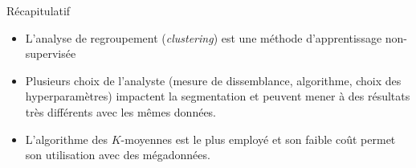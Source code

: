 \documentclass[
  ignorenonframetext,
]{beamer}
\providecommand{\tightlist}{%
  \setlength{\itemsep}{0pt}\setlength{\parskip}{0pt}}\usepackage{longtable,booktabs,array}
\begin{document}
\begin{frame}{Récapitulatif}
\protect\hypertarget{ruxe9capitulatif}{}
\begin{itemize}
\tightlist
\item
  L'analyse de regroupement (\emph{clustering}) est une méthode
  d'apprentissage non-supervisée
\item
  Plusieurs choix de l'analyste (mesure de dissemblance, algorithme,
  choix des hyperparamètres) impactent la segmentation et peuvent mener
  à des résultats très différents avec les mêmes données.
\item
  L'algorithme des \(K\)-moyennes est le plus employé et son faible coût
  permet son utilisation avec des mégadonnées.
\end{itemize}
\end{frame}
\end{document}
